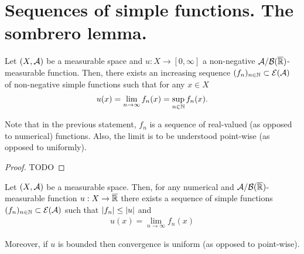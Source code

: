 \section{Sequences of simple functions. The sombrero lemma.}

\begin{thm}
	\label{thm:sombrero}
	
	Let $(X, \mathcal{A})$ be a measurable space and $u : X \to [0, \infty]$ a non-negative $\mathcal{A}/\mathcal{B}({\overline{\mathbb{R}}})$-measurable function. Then, there exists an increasing sequence $(f_n)_{n \in \mathbb{N}} \subset \mathcal{E}(\mathcal{A})$ of non-negative simple functions such that for any $x \in X$
	\begin{align*}
		u(x) = \lim_{n\to \infty} f_n(x) = \sup_{n\in\mathbb{N}} f_n(x).
	\end{align*}
\end{thm}

Note that in the previous statement, $f_n$ is a sequence of real-valued (as opposed to numerical) functions. Also, the limit is to be understood point-wise (as opposed to uniformly).

\begin{proof}
	TODO
\end{proof}

\begin{cor}
	Let $(X, \mathcal{A})$ be a measurable space. Then, for any numerical and $\mathcal{A}/\mathcal{B}({\overline{\mathbb{R}}})$-measurable function $u: X \to {\overline{\mathbb{R}}}$ there exists a sequence of simple functions $(f_n)_{n\in \mathbb{N}} \subset \mathcal{E}(\mathcal{A})$ such that $\left\vert{f_n}\right\vert \leq \left\vert{u}\right\vert$ and
	\begin{align*}
		u(x) = \lim_{n\to \infty} f_n(x)
	\end{align*}
	
	Moreover, if $u$ is bounded then convergence is uniform (as opposed to point-wise).
\end{cor}

